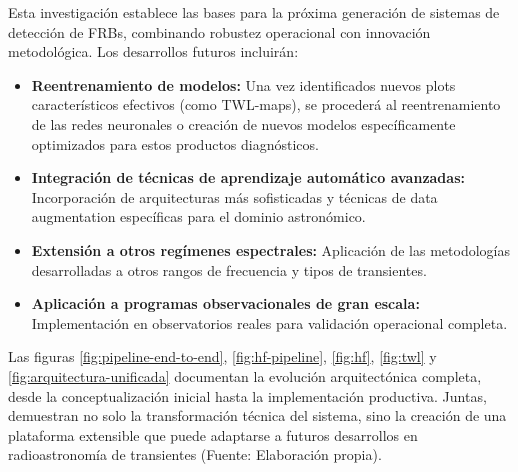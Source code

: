 Esta investigación establece las bases para la próxima generación de sistemas de detección de FRBs, combinando robustez operacional con innovación metodológica. Los desarrollos futuros incluirán:

\begin{itemize}
\item \textbf{Reentrenamiento de modelos:} Una vez identificados nuevos plots característicos efectivos (como TWL-maps), se procederá al reentrenamiento de las redes neuronales o creación de nuevos modelos específicamente optimizados para estos productos diagnósticos.
\item \textbf{Integración de técnicas de aprendizaje automático avanzadas:} Incorporación de arquitecturas más sofisticadas y técnicas de data augmentation específicas para el dominio astronómico.
\item \textbf{Extensión a otros regímenes espectrales:} Aplicación de las metodologías desarrolladas a otros rangos de frecuencia y tipos de transientes.
\item \textbf{Aplicación a programas observacionales de gran escala:} Implementación en observatorios reales para validación operacional completa.
\end{itemize}

Las figuras \ref{fig:pipeline-end-to-end}, \ref{fig:hf-pipeline}, \ref{fig:hf}, \ref{fig:twl} y \ref{fig:arquitectura-unificada} documentan la evolución arquitectónica completa, desde la conceptualización inicial hasta la implementación productiva. Juntas, demuestran no solo la transformación técnica del sistema, sino la creación de una plataforma extensible que puede adaptarse a futuros desarrollos en radioastronomía de transientes (Fuente: Elaboración propia).